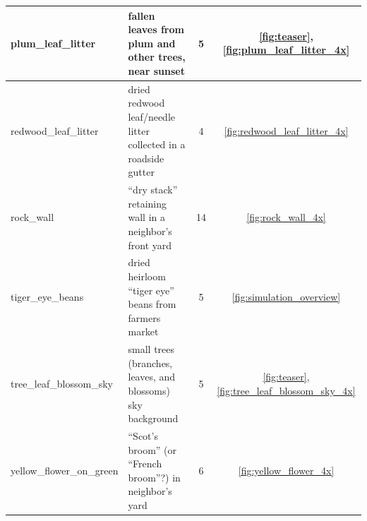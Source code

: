 \documentclass[letterpaper]{article}
\begin{document}
\begin{minipage}{\linewidth}
\begin{minipage}{\linewidth-1.1cm}
\begin{table}[H]
\begin{tabular}{ |l|l|c|c| }
\hline
plum\_leaf\_litter &
    fallen leaves from plum and other trees, near sunset &
    5 & \ref{fig:teaser}, \ref{fig:plum_leaf_litter_4x} \\
\hline
redwood\_leaf\_litter &
    dried redwood leaf/needle litter collected in a roadside gutter &
    4 & \ref{fig:redwood_leaf_litter_4x} \\
\hline
rock\_wall &
    “dry stack” retaining wall in a neighbor's front yard &
    14 & \ref{fig:rock_wall_4x} \\
\hline
tiger\_eye\_beans &
    dried heirloom “tiger eye” beans from farmers market  &
    5 & \ref{fig:simulation_overview} \\
\hline
tree\_leaf\_blossom\_sky &
    small trees (branches, leaves, and blossoms) sky background &
    5 & \ref{fig:teaser}, \ref{fig:tree_leaf_blossom_sky_4x} \\
\hline
yellow\_flower\_on\_green &
    “Scot's broom” (or “French broom”?) in neighbor's yard &
    6 & \ref{fig:yellow_flower_4x} \\
\hline
\end{tabular}
\label{table:background_sets}
\end{table}
\end{minipage}
\end{minipage}
\end{document}
